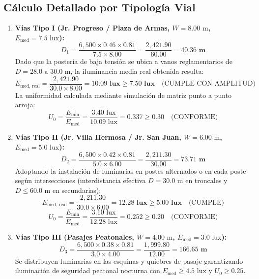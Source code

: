 \subsection{Cálculo Detallado por Tipología Vial}
\begin{enumerate}
    \item \textbf{Vías Tipo I (Jr. Progreso / Plaza de Armas, $W = 8.00\text{ m}$, $E_{\text{med}} = 7.5\text{ lux}$):}
      $$D_1 = \frac{6,500 \times 0.46 \times 0.81}{7.5 \times 8.00} = \frac{2,421.90}{60.00} = \mathbf{40.36\text{ m}}$$
      Dado que la postería de baja tensión se ubica a vanos reglamentarios de $D = 28.0\text{ a } 30.0\text{ m}$, la iluminancia media real obtenida resulta:
      $$E_{\text{med, real}} = \frac{2,421.90}{30.0 \times 8.00} = \mathbf{10.09\text{ lux}} \ge \mathbf{7.50\text{ lux}} \quad \text{(CUMPLE CON AMPLITUD)}$$
      La uniformidad calculada mediante simulación de matriz punto a punto arroja:
      $$U_0 = \frac{E_{\text{min}}}{E_{\text{med}}} = \frac{3.40\text{ lux}}{10.09\text{ lux}} = \mathbf{0.337} \ge \mathbf{0.30} \quad \text{(CONFORME)}$$

    \item \textbf{Vías Tipo II (Jr. Villa Hermosa / Jr. San Juan, $W = 6.00\text{ m}$, $E_{\text{med}} = 5.0\text{ lux}$):}
      $$D_2 = \frac{6,500 \times 0.42 \times 0.81}{5.0 \times 6.00} = \frac{2,211.30}{30.00} = \mathbf{73.71\text{ m}}$$
      Adoptando la instalación de luminarias en postes alternados o en cada poste según intersecciones (interdistancia efectiva $D = 30.0\text{ m}$ en troncales y $D \le 60.0\text{ m}$ en secundarias):
      $$E_{\text{med, real}} = \frac{2,211.30}{30.0 \times 6.00} = \mathbf{12.28\text{ lux}} \ge \mathbf{5.00\text{ lux}} \quad \text{(CUMPLE)}$$
      $$U_0 = \frac{E_{\text{min}}}{E_{\text{med}}} = \frac{3.10\text{ lux}}{12.28\text{ lux}} = \mathbf{0.252} \ge \mathbf{0.20} \quad \text{(CONFORME)}$$

    \item \textbf{Vías Tipo III (Pasajes Peatonales, $W = 4.00\text{ m}$, $E_{\text{med}} = 3.0\text{ lux}$):}
      $$D_3 = \frac{6,500 \times 0.38 \times 0.81}{3.0 \times 4.00} = \frac{1,999.80}{12.00} = \mathbf{166.65\text{ m}}$$
      Se distribuyen luminarias en las esquinas y quiebres de pasaje garantizando iluminación de seguridad peatonal nocturna con $E_{\text{med}} \ge 4.5\text{ lux}$ y $U_0 \ge 0.25$.
\end{enumerate}

